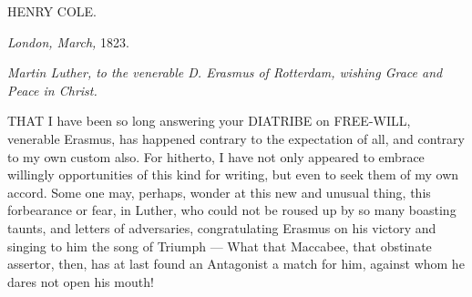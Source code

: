 HENRY COLE.

\emph{London, March, }1823.


\emph{Martin Luther, to the venerable D. Erasmus of Rotterdam, wishing Grace and Peace in Christ.}

THAT I have been so long answering your \textsc{DIATRIBE} on \textsc{FREE-WILL}, venerable Erasmus, has happened contrary to the expectation of all, and contrary to my own custom also. For hitherto, I have not only appeared to embrace willingly opportunities of this kind for writing, but even to seek them of my own accord. Some one may, perhaps, wonder at this new and unusual thing, this forbearance or fear, in Luther, who could not be roused up by so many boasting taunts, and letters of adversaries, congratulating Erasmus on his victory and singing to him the song of Triumph — What that Maccabee, that obstinate assertor, then, has at last found an Antagonist a match for him, against whom he dares not open his mouth!

